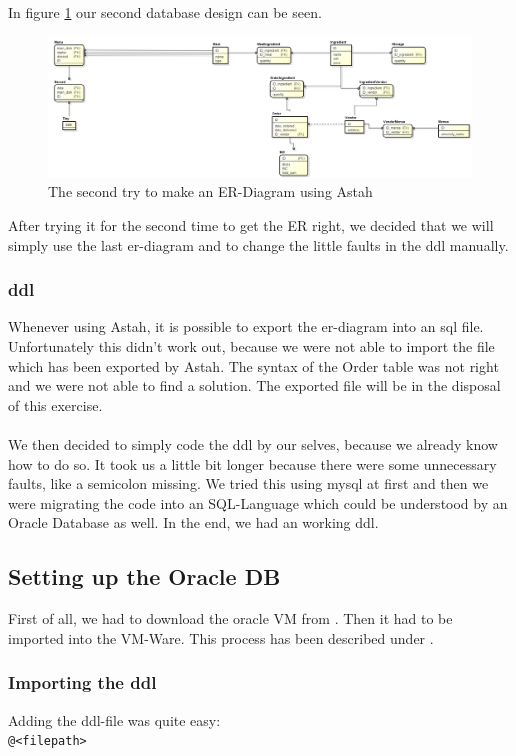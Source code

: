 \documentclass[12pt]{article}
\begin{document}
In figure \ref{fig:try2} our second database design can be seen. 
 \begin{figure}[here!]
	\centering
	\includegraphics[width=1.0\textwidth]{images/neu.png}
	\caption{The second try to make an ER-Diagram using Astah}
	\label{fig:try2}
	\end{figure}	

After trying it for the second time to get the ER right, we decided that we will simply use the last \gls{er}-diagram and to change the little faults in the \gls{ddl} manually.
\FloatBarrier	
\subsubsection{\gls{ddl}}
Whenever using Astah, it is possible to export the \gls{er}-diagram into an \gls{sql} file. \\
Unfortunately this didn't work out, because we were not able to import the file which has been exported by Astah.
The syntax of the Order table was not right and we were not able to find a solution. The exported file will be in the disposal of this exercise. \\ \\
We then decided to simply code the \gls{ddl} by our selves, because we already know how to do so. It took us a little bit longer because there were some unnecessary faults, like a semicolon missing. We tried this using mysql at first and then we were migrating the code into an SQL-Language which could be understood by an Oracle Database as well.
In the end, we had an working \gls{ddl}.
\subsection{Setting up the Oracle DB}
First of all, we had to download the oracle VM from \cite{oraclevm}. Then it had to be imported into the VM-Ware. This process has been described under \cite{oraclevm2}.\\
\subsubsection{Importing the \gls{ddl}}
Adding the \gls{ddl}-file was quite easy:  \\
\texttt{@<filepath>} 
\end{document}
